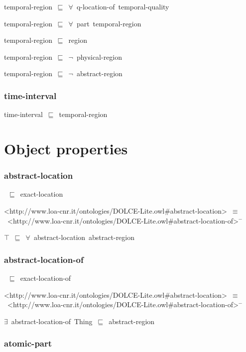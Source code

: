 \documentclass{article}
\begin{document}
temporal-region~\ensuremath{\sqsubseteq}~\ensuremath{\forall}~q-location-of~temporal-quality~

temporal-region~\ensuremath{\sqsubseteq}~\ensuremath{\forall}~part~temporal-region~

temporal-region~\ensuremath{\sqsubseteq}~region~

temporal-region~\ensuremath{\sqsubseteq}~\ensuremath{\lnot}~physical-region

temporal-region~\ensuremath{\sqsubseteq}~\ensuremath{\lnot}~abstract-region

\subsubsection*{time-interval}

time-interval~\ensuremath{\sqsubseteq}~temporal-region~

\section*{Object properties}\subsubsection*{abstract-location}

~\ensuremath{\sqsubseteq}~exact-location

<http://www.loa-cnr.it/ontologies/DOLCE-Lite.owl#abstract-location>~\ensuremath{\equiv}~<http://www.loa-cnr.it/ontologies/DOLCE-Lite.owl#abstract-location-of>\ensuremath{^-}

\ensuremath{\top}~\ensuremath{\sqsubseteq}~\ensuremath{\forall}~abstract-location~abstract-region

\subsubsection*{abstract-location-of}

~\ensuremath{\sqsubseteq}~exact-location-of

<http://www.loa-cnr.it/ontologies/DOLCE-Lite.owl#abstract-location>~\ensuremath{\equiv}~<http://www.loa-cnr.it/ontologies/DOLCE-Lite.owl#abstract-location-of>\ensuremath{^-}

\ensuremath{\exists}~abstract-location-of~Thing~\ensuremath{\sqsubseteq}~abstract-region

\subsubsection*{atomic-part}
\end{document}
